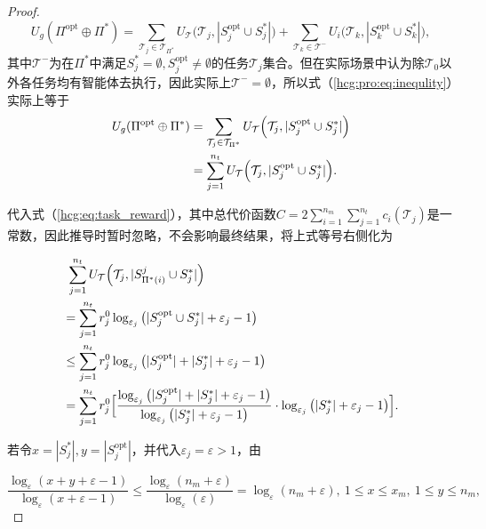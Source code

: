 \begin{proposition}
\begin{proof}
		\begin{equation}
		\label{hcg:pro:eq:inequlity}
			U_g(\Pi^{\text{opt}} \oplus \Pi^*) = \sum_{\mathcal{T}_j \in \mathcal{T}_{\Pi^*}} U_{\mathcal{T}} \Big(\mathcal{T}_j, |S_j^{\text{opt}} \cup S_j^*|\Big) + \sum_{\mathcal{T}_k \in \mathcal{T}^-} U_i\Big(\mathcal{T}_k, |S_k^{\text{opt}} \cup S_k^*|\Big),
		\end{equation}
		其中$\mathcal{T}^-$为在$\Pi^*$中满足$S_j^* = \emptyset, S_j^{\text{opt}} \neq \emptyset$的任务$\mathcal{T}_j$集合。但在实际场景中认为除$\mathcal{T}_0$以外各任务均有智能体去执行，因此实际上$\mathcal{T}^- = \emptyset$，所以式（\ref{hcg:pro:eq:inequlity}）实际上等于
		\begin{align}
			U_g(\Pi^{\text{opt}} \oplus \Pi^*) &= \sum_{\mathcal{T}_j \in \mathcal{T}_{\Pi^*}} U_{\mathcal{T}} \Big(\mathcal{T}_j, |S_j^{\text{opt}} \cup S_j^*|\Big)\notag\\
			&= \sum_{j=1}^{n_t} U_{\mathcal{T}} \Big(\mathcal{T}_j, |S_j^{\text{opt}} \cup S_j^*|\Big).
		\end{align}
			
		 代入式（\ref{hcg:eq:task_reward}），其中总代价函数$C=2\sum_{i=1}^{n_m} \sum_{j=1}^{n_t} c_i(\mathcal{T}_j)$是一常数，因此推导时暂时忽略，不会影响最终结果，将上式等号右侧化为
		
		\begin{align}
			&\ \sum_{j=1}^{n_t} U_{\mathcal{T}}\Big(\mathcal{T}_j,|S_{\Pi^*(i)}^j \cup S_j^*|\Big)\notag\\
			&= \sum_{j=1}^{n_t} r_j^0 \log_{\varepsilon_j} \big(|S_j^{\text{opt}} \cup S_j^*| + \varepsilon_j - 1\big)\notag\\
			&\leq \sum_{j=1}^{n_t} r_j^0 \log_{\varepsilon_j} \big(|S_j^{\text{opt}}| + |S_j^*| + \varepsilon_j - 1\big)\notag\\
			\label{hcg:pro:eq:expand}&= \sum_{j=1}^{n_t} r_j^0 \Big[ \frac{\log_{\varepsilon_j} \big(|S_j^{\text{opt}}| + |S_j^*| + \varepsilon_j - 1\big)}{\log_{\varepsilon_j}\big(|S_j^*|+ \varepsilon_j - 1\big)} \cdot \log_{\varepsilon_j}\big(|S_j^*|+ \varepsilon_j - 1\big)\Big].
		\end{align}
		
		若令$x=|S_j^*|,y=|S_j^{\text{opt}}|$，并代入$\varepsilon_j = \varepsilon>1$，由
		
		\begin{equation}
			\frac{\log_{\varepsilon}(x+y+\varepsilon-1)}{\log_{\varepsilon}(x+\varepsilon-1)} \leq \frac{\log_{\varepsilon}(n_m+\varepsilon)}{\log_{\varepsilon}(\varepsilon)} = \log_{\varepsilon}(n_m+\varepsilon),\ 1\leq x \leq x_m,\ 1 \leq y \leq n_m,
		\end{equation}
		

\end{proof}
\end{proposition}
